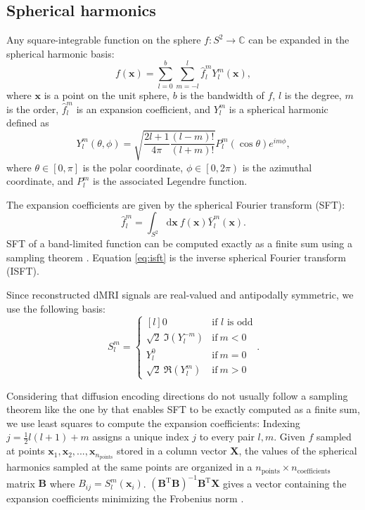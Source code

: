 \documentclass[10pt, letterpaper, oneside]{article}
\begin{document}
\subsection{Spherical harmonics}

Any square-integrable function on the sphere $f: S^2 \rightarrow \mathbb{C}$ can be expanded in the spherical harmonic basis:
\begin{equation}\label{eq:isft}
f(\mathbf{x}) = \sum_{l=0}^b \sum_{m=-l}^l \hat{f}_l^m Y_l^m(\mathbf{x}) ,
\end{equation}
where $\mathbf{x}$ is a point on the unit sphere, $b$ is the bandwidth of $f$, $l$ is the degree, $m$ is the order, $\hat{f}_l^m$ is an expansion coefficient, and $Y_l^m$ is a spherical harmonic defined as
\begin{equation}
Y_l^m(\theta, \phi) = \sqrt{\frac{2l+1}{4\pi}\frac{(l-m)!}{(l+m)!}} P_l^m(\cos \theta) e^{im\phi} ,
\end{equation}
where $\theta \in \left[ 0, \pi \right]$ is the polar coordinate, $\phi \in \left[0, 2 \pi \right)$ is the azimuthal coordinate, and $P_l^m$ is the associated Legendre function.

The expansion coefficients are given by the spherical Fourier transform (SFT):
\begin{equation}\label{eq:sft}
\hat{f}_l^m = \int_{S^2} \text{d}\mathbf{x} \ f(\mathbf{x}) \bar{Y}_l^m(\mathbf{x}) .
\end{equation}
SFT of a band-limited function can be computed exactly as a finite sum using a sampling theorem \citep{driscoll1994computing}. Equation \ref{eq:isft} is the inverse spherical Fourier transform (ISFT).

Since reconstructed dMRI signals are real-valued and antipodally symmetric, we use the following basis:
\begin{equation}\label{eq:basis}
S_l^m = \left\{\begin{matrix*}[l]
0 & \text{if } l \text{ is odd} \\
\sqrt{2} \ \Im \left( Y_l^{-m} \right) & \text{if} \ m < 0 \\ 
Y_l^0 & \text{if} \ m = 0 \\
\sqrt{2} \ \Re \left( Y_l^{m} \right) & \text{if} \ m > 0 
\end{matrix*}\right . .
\end{equation}

Considering that diffusion encoding directions do not usually follow a sampling theorem like the one by \cite{driscoll1994computing} that enables SFT to be exactly computed as a finite sum, we use least squares to compute the expansion coefficients: Indexing $j = \frac{1}{2}l(l + 1) + m$ assigns a unique index $j$ to every pair $l, m$. Given $f$ sampled at points $\mathbf{x}_1, \mathbf{x}_2, ..., \mathbf{x}_{n_\text{points}}$ stored in a column vector $\mathbf{X}$, the values of the spherical harmonics sampled at the same points are organized in a $n_\text{points} \times n_\text{coefficients}$ matrix $\mathbf{B}$ where $B_{ij} = S_l^m(\mathbf{x}_i)$. $\left( \mathbf{B}^{\text{T}}\mathbf{B} \right)^{-1} \mathbf{B}^{\text{T}} \mathbf{X}$ gives a vector containing the expansion coefficients minimizing the Frobenius norm \citep{brechbuhler1995parametrization}.
\end{document}
